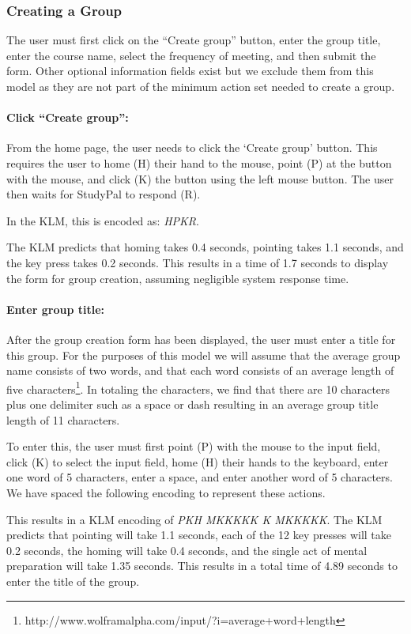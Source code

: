\documentclass[conference]{IEEEtran}
\begin{document}
\subsubsection{Creating a Group}
The user must first click on the ``Create group'' button, enter the group title, enter the course name, select the frequency of meeting, and then submit the form.
Other optional information fields exist but we exclude them from this model as they are not part of the minimum action set needed to create a group.

\paragraph{Click ``Create group'':}
From the home page, the user needs to click the `Create group' button.
This requires the user to home (H) their hand to the mouse, point (P) at the button with the mouse, and click (K) the button using the left mouse button.
The user then waits for StudyPal to respond (R).

In the KLM, this is encoded as: \emph{HPKR}.

The KLM predicts that homing takes 0.4 seconds, pointing takes 1.1 seconds, and the key press takes 0.2 seconds.
This results in a time of 1.7 seconds to display the form for group creation, assuming negligible system response time.

\paragraph{Enter group title:}
After the group creation form has been displayed, the user must enter a title for this group.
For the purposes of this model we will assume that the average group name consists of two words, and that each word consists of an average length of five characters\footnote{http://www.wolframalpha.com/input/?i=average+word+length}.
In totaling the characters, we find that there are 10 characters plus one delimiter such as a space or dash resulting in an average group title length of 11 characters.

To enter this, the user must first point (P) with the mouse to the input field, click (K) to select the input field, home (H) their hands to the keyboard, enter one word of 5 characters, enter a space, and enter another word of 5 characters.
We have spaced the following encoding to represent these actions.

This results in a KLM encoding of \emph{PKH MKKKKK K MKKKKK}.
The KLM predicts that pointing will take 1.1 seconds, each of the 12 key presses will take 0.2 seconds, the homing will take 0.4 seconds, and the single act of mental preparation will take 1.35 seconds.
This results in a total time of 4.89 seconds to enter the title of the group.
\end{document}
